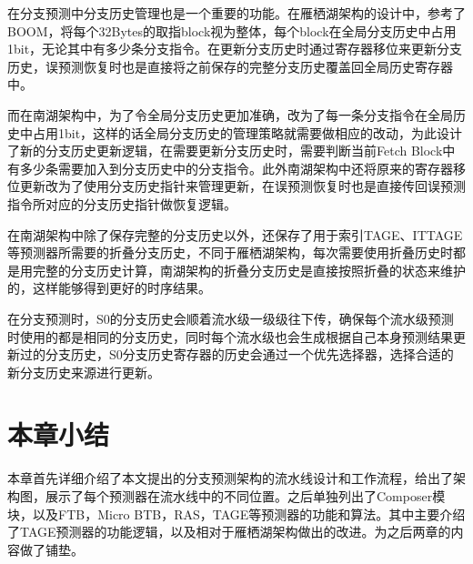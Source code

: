 在分支预测中分支历史管理也是一个重要的功能。在雁栖湖架构的设计中，参考了BOOM，将每个32Bytes的取指block视为整体，每个block在全局分支历史中占用1bit，无论其中有多少条分支指令。在更新分支历史时通过寄存器移位来更新分支历史，误预测恢复时也是直接将之前保存的完整分支历史覆盖回全局历史寄存器中。

而在南湖架构中，为了令全局分支历史更加准确，改为了每一条分支指令在全局历史中占用1bit，这样的话全局分支历史的管理策略就需要做相应的改动，为此设计了新的分支历史更新逻辑，在需要更新分支历史时，需要判断当前Fetch Block中有多少条需要加入到分支历史中的分支指令。此外南湖架构中还将原来的寄存器移位更新改为了使用分支历史指针来管理更新，在误预测恢复时也是直接传回误预测指令所对应的分支历史指针做恢复逻辑。

在南湖架构中除了保存完整的分支历史以外，还保存了用于索引TAGE、ITTAGE等预测器所需要的折叠分支历史，不同于雁栖湖架构，每次需要使用折叠历史时都是用完整的分支历史计算，南湖架构的折叠分支历史是直接按照折叠的状态来维护的，这样能够得到更好的时序结果。

在分支预测时，S0的分支历史会顺着流水级一级级往下传，确保每个流水级预测时使用的都是相同的分支历史，同时每个流水级也会生成根据自己本身预测结果更新过的分支历史，S0分支历史寄存器的历史会通过一个优先选择器，选择合适的新分支历史来源进行更新。

\section{本章小结}

本章首先详细介绍了本文提出的分支预测架构的流水线设计和工作流程，给出了架构图，展示了每个预测器在流水线中的不同位置。之后单独列出了Composer模块，以及FTB，Micro BTB，RAS，TAGE等预测器的功能和算法。其中主要介绍了TAGE预测器的功能逻辑，以及相对于雁栖湖架构做出的改进。为之后两章的内容做了铺垫。